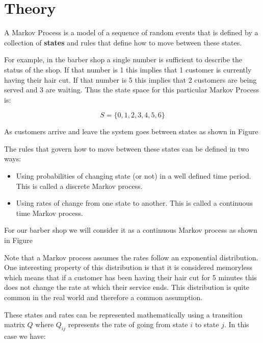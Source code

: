 \section{Theory}\label{sec:theory}

A Markov Process is a model of a sequence of random events that is defined by a
collection of \textbf{states} and rules that define how to move between these
states.

For example, in the barber shop a single number is sufficient to describe the
status of the shop. If that number is 1 this implies that 1 customer is
currently having their hair cut. If that number is 5 this implies that 2
customers are being served and 3 are waiting. Thus the state space for this
particular Markov Process is:

\begin{equation}
    S = \{0, 1, 2, 3, 4, 5, 6\}
    \label{eqn:barber_shop_state_space}
\end{equation}

As customers arrive and leave the system goes between states as shown in Figure

The rules that govern how to move between these states can be defined in two
ways:

\begin{itemize}
    \item Using probabilities of changing state (or not) in a well defined time
        period.  This is called a discrete Markov process.
    \item Using rates of change from one state to another. This is called a
        continuous time Markov process.
\end{itemize}

For our barber shop we will consider it as a continuous Markov process as shown
in Figure %

Note that a Markov process assumes the rates follow an exponential distribution.
One interesting property of this distribution is that it is considered
memoryless which means that if a customer has been having their hair cut for 5
minutes this does not change the rate at which their service ends.
This distribution is quite common in the real world and therefore a common
assumption.

These states and rates can be represented mathematically using a transition
matrix \(Q\) where \(Q_{ij}\) represents the rate of going from state \(i\) to
state \(j\). In this case we have:

